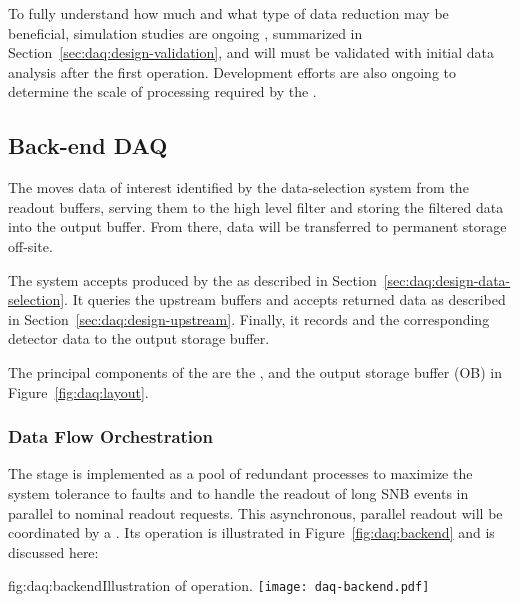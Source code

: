 To fully understand how much and what type of data reduction may be
beneficial, simulation studies are ongoing \cite{bib:docdb11311},
summarized in Section~\ref{sec:daq:design-validation}, and will
must be
validated with initial data analysis after the
first   operation. Development efforts are also ongoing to determine the scale of 
processing required by the .


\subsection{Back-end DAQ}
\label{sec:daq:design-backend}

The   moves data of interest identified by the data-selection system from the readout  buffers, 
serving them to the high level filter and storing the filtered data into the output buffer. From there, 
data will be transferred to permanent storage off-site.

The  system accepts  produced by the  as described
in Section~\ref{sec:daq:design-data-selection}.  It queries the upstream  buffers and
accepts returned data as described in Section~\ref{sec:daq:design-upstream}. Finally, it records
 and the corresponding detector data to the output storage buffer.

The principal components of the  are the ,  and the output
storage buffer (OB) in Figure~\ref{fig:daq:layout}.

\subsubsection{Data Flow Orchestration}

The  stage is implemented as a pool of redundant  processes to maximize the system tolerance to faults and to handle the readout of long SNB events in parallel to nominal readout requests. This asynchronous, parallel readout will be coordinated by a .  Its operation is illustrated in Figure~\ref{fig:daq:backend} and is discussed here:


\begin{dunefigure}{fig:daq:backend}{Illustration of   operation.}
  \texttt{[image: daq-backend.pdf]}
\end{dunefigure}

